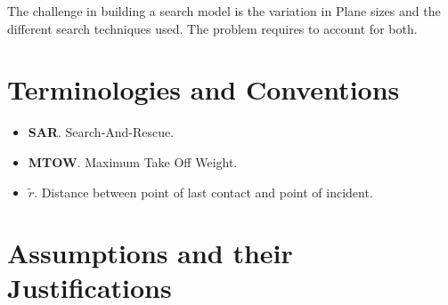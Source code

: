 \documentclass[12pt, letterpaper]{article}  %
\theoremstyle{definition}
\theoremstyle{remark}
\theoremstyle{plain}
\begin{document}
The challenge in building a search model is the variation in Plane sizes and the different search techniques used. The problem requires to account for both.


\section{Terminologies and Conventions}\label{sec:terms}

\begin{itemize}
\item \textbf{SAR}. Search-And-Rescue.

\item \textbf{MTOW}. Maximum Take Off Weight.

\item \textbf{$\tilde{r}$}. Distance between point of last contact and point of incident.


\end{itemize}


\section{Assumptions and their Justifications}\label{sec:assumptions}
\end{document}
